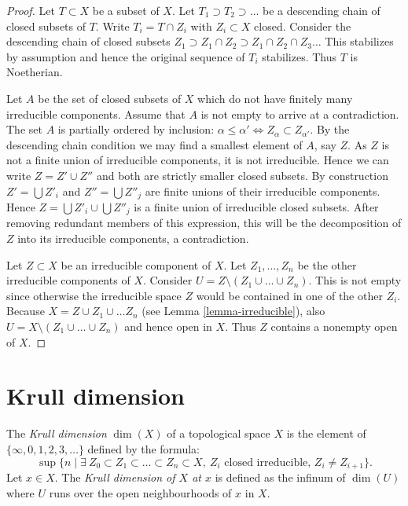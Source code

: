 \begin{proof}
Let $T \subset X$ be a subset of $X$.
Let $T_1 \supset T_2 \supset \ldots$
be a descending chain of closed subsets of $T$.
Write $T_i =  T \cap Z_i$ with $Z_i \subset X$ closed.
Consider the descending chain of closed subsets
$Z_1 \supset Z_1\cap Z_2 \supset Z_1 \cap Z_2 \cap Z_3 \ldots$
This stabilizes by assumption and hence the original sequence
of $T_i$ stabilizes. Thus $T$ is Noetherian.

\medskip\noindent
Let $A$ be the set of closed subsets of $X$ which do not
have finitely many irreducible components. Assume that
$A$ is not empty to arrive at a contradiction. 
The set $A$ is partially ordered by inclusion: $\alpha \leq \alpha'
\Leftrightarrow Z_{\alpha} \subset Z_{\alpha'}$.
By the descending chain condition we may find a 
smallest element of $A$, say $Z$. As $Z$ is not a finite
union of irreducible components, it is not irreducible.
Hence we can write $Z = Z' \cup Z''$ and both are strictly smaller
closed subsets. By construction $Z' = \bigcup Z'_i$ and
$Z'' = \bigcup Z''_j$ are finite unions of their irreducible
components. Hence $Z = \bigcup Z'_i \cup \bigcup Z''_j$ is
a finite union of irreducible closed subsets.
After removing redundant members of this expression,
this will be the decomposition of $Z$ into its irreducible
components, a contradiction.

\medskip\noindent
Let $Z \subset X$ be an irreducible component of $X$.
Let $Z_1,\ldots,Z_n$ be the other irreducible components
of $X$. Consider $U = Z \setminus (Z_1\cup\ldots\cup Z_n)$.
This is not empty since otherwise the irreducible space
$Z$ would be contained in one of the other $Z_i$.
Because $X = Z \cup Z_1 \cup \ldots Z_n$ (see Lemma \ref{lemma-irreducible}),
also $U = X \setminus (Z_1\cup\ldots\cup Z_n)$
and hence open in $X$. Thus $Z$ contains a nonempty
open of $X$.
\end{proof}

\section{Krull dimension}
\label{section-krull-dimension}

\begin{definition}
\label{definition-Krull}
The {\it Krull dimension} $\dim(X)$ of a topological space $X$ is
the element of $\{\infty,0,1,2,3,\ldots\}$ defined by the formula:
$$
\sup
\{
n
\mid
\exists\ Z_0 \subset Z_1 \subset \ldots \subset Z_n \subset X,\ 
Z_i\text{ closed irreducible, }Z_i \not=Z_{i+1}
\}.
$$
Let $x \in X$.
The {\it Krull dimension of $X$ at $x$} is defined as the infinum
of $\dim(U)$ where $U$ runs over the open neighbourhoods of $x$
in $X$.
\end{definition}

